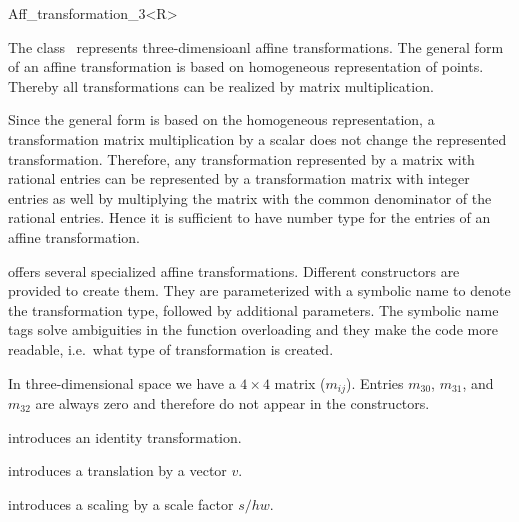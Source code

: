 \begin{ccRefClass}{Aff_transformation_3<R>}

\ccDefinition
The class \ccRefName\ represents three-dimensioanl affine transformations. 
The general form of an affine transformation is based on homogeneous
representation of points. Thereby all transformations can be realized by
matrix multiplication. 

Since the general form is based on the homogeneous representation, a
transformation matrix multiplication by a scalar does not change
the represented transformation. Therefore, any transformation represented
by a matrix with rational entries can be represented by a 
transformation matrix with integer entries as well by multiplying
the matrix with the common denominator of the rational entries. 
Hence it is sufficient to have number type  for the entries 
of an affine transformation.

{\cgal} offers several specialized affine transformations. 
Different constructors are provided to create them. 
They are parameterized with a symbolic name to
denote the transformation type, followed by additional parameters.
The symbolic name tags solve ambiguities in the function
overloading and they make the code more readable, i.e.\ what type
of transformation is created.

In three-dimensional space we have a $4\times 4$ matrix ($m_{ij}$).
Entries $m_{30}$, $m_{31}$, and $m_{32}$ are always zero and 
therefore do not appear in the constructors.

\ccCreation
{}

            {introduces an identity transformation.}


            {introduces a translation by a vector $v$.}
 
            {introduces a scaling by a scale factor $s/hw$.}

\newsavebox{\arrthree}
\newsavebox{\arrlinthree}
\newsavebox{\transvecthree}



\end{ccRefClass}
